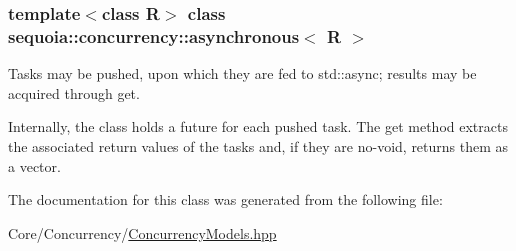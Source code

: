 \subsubsection*{template$<$class R$>$\newline
class sequoia\+::concurrency\+::asynchronous$<$ R $>$}

Tasks may be pushed, upon which they are fed to std\+::async; results may be acquired through get. 

Internally, the class holds a future for each pushed task. The get method extracts the associated return values of the tasks and, if they are no-\/void, returns them as a vector. 

The documentation for this class was generated from the following file\+:\begin{DoxyCompactItemize}
\item 
Core/\+Concurrency/\mbox{\hyperlink{_concurrency_models_8hpp}{Concurrency\+Models.\+hpp}}\end{DoxyCompactItemize}
